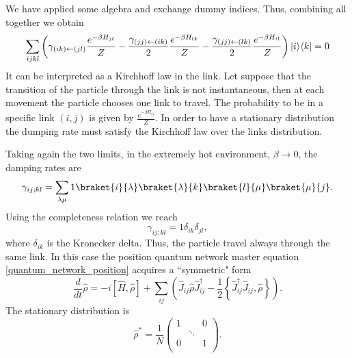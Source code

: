 We have applied some algebra and exchange dummy indices.
Thus, combining all together we obtain
\begin{equation}
    \begin{split}
        \sum_{ijkl}\left(\gamma_{(ik)\leftarrow(jl)} \frac{e^{-\beta H_{jl}}}{Z} - \frac{\gamma_{(jj)\leftarrow(ik)}}{2} \frac{e^{-\beta H_{lk}}}{Z} - \frac{\gamma_{(jj)\leftarrow(lk)}}{2}\frac{e^{-\beta H_{il}}}{Z}\right)\lvert i\rangle\langle k\rvert = 0\\
    \end{split}
\end{equation}
It can be interpreted as a Kirchhoff law in the link. Let suppose that the transition of the particle through the link is not instantaneous, then at each movement the particle chooses one link to travel. The probability to be in a specific link $(i,j)$ is given by $\frac{e^{-\beta H_{ij}}}{Z}$. In order to have a stationary distribution the dumping rate must satisfy the Kirchhoff law over the links distribution.

Taking again the two limits, in the extremely hot environment, $\beta \rightarrow 0$, the damping rates are
\begin{equation}
    \gamma_{ij;kl}= \sum_{\lambda\mu} 1 \braket{i}{\lambda}\braket{\lambda}{k}\braket{l}{\mu}\braket{\mu}{j}.
\end{equation}
Using the completeness relation we reach
\begin{equation}
    \gamma_{ij;kl} = 1 \delta_{ik}\delta_{jl},
\end{equation}
where $\delta_{ik}$ is the Kronecker delta. Thus, the particle travel always through the same link.
In this case the position quantum network master equation \eqref{quantum_network_position} acquires a “symmetric" form
\begin{equation}
    \frac{d}{dt}\hat\rho = -i\left[\hat H,\hat\rho\right] +\sum_{ij}\left(\hat J_{ij}\hat\rho \hat J_{ij}^\dagger - \frac{1}{2}\left\{ \hat J_{ij}^\dagger\hat J_{ij}, \hat\rho\right\} \right).
\end{equation}
The stationary distribution is 
\begin{equation}
    \hat\rho^* = \frac{1}{N}\begin{pmatrix}
        1&&0\\
        &\ddots&\\
        0&&1\\
    \end{pmatrix}.
\end{equation}

